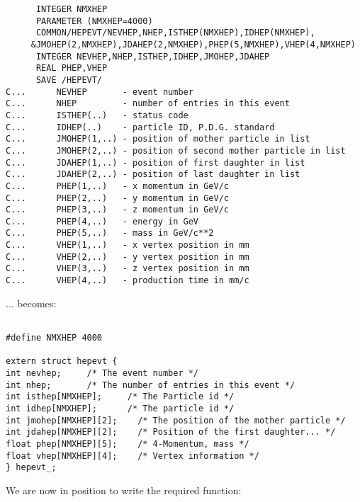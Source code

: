 \begin{verbatim}
      INTEGER NMXHEP
      PARAMETER (NMXHEP=4000)
      COMMON/HEPEVT/NEVHEP,NHEP,ISTHEP(NMXHEP),IDHEP(NMXHEP),
     &JMOHEP(2,NMXHEP),JDAHEP(2,NMXHEP),PHEP(5,NMXHEP),VHEP(4,NMXHEP)
      INTEGER NEVHEP,NHEP,ISTHEP,IDHEP,JMOHEP,JDAHEP
      REAL PHEP,VHEP
      SAVE /HEPEVT/
C...      NEVHEP       - event number
C...      NHEP         - number of entries in this event
C...      ISTHEP(..)   - status code
C...      IDHEP(..)    - particle ID, P.D.G. standard
C...      JMOHEP(1,..) - position of mother particle in list
C...      JMOHEP(2,..) - position of second mother particle in list
C...      JDAHEP(1,..) - position of first daughter in list
C...      JDAHEP(2,..) - position of last daughter in list
C...      PHEP(1,..)   - x momentum in GeV/c
C...      PHEP(2,..)   - y momentum in GeV/c
C...      PHEP(3,..)   - z momentum in GeV/c
C...      PHEP(4,..)   - energy in GeV
C...      PHEP(5,..)   - mass in GeV/c**2
C...      VHEP(1,..)   - x vertex position in mm
C...      VHEP(2,..)   - y vertex position in mm
C...      VHEP(3,..)   - z vertex position in mm
C...      VHEP(4,..)   - production time in mm/c
\end{verbatim}

... becomes: 

\begin{verbatim}

#define NMXHEP 4000

extern struct hepevt {
int nevhep;		/* The event number */
int nhep;		/* The number of entries in this event */
int isthep[NMXHEP]; 	/* The Particle id */
int idhep[NMXHEP];      /* The particle id */
int jmohep[NMXHEP][2];    /* The position of the mother particle */
int jdahep[NMXHEP][2];    /* Position of the first daughter... */
float phep[NMXHEP][5];    /* 4-Momentum, mass */
float vhep[NMXHEP][4];    /* Vertex information */
} hepevt_;
\end{verbatim}

	We are now in position to write the required function:
	
